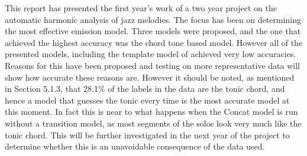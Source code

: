 \documentclass[bsc,singlespacing,parskip,deptreport,twoside,frontabs]{infthesis}
\begin{document}
This report has presented the first year's work of a two year project on the automatic harmonic analysis of jazz melodies. The focus has been on determining the most effective emission model. Three models were proposed, and the one that achieved the highest accuracy was the chord tone based model. However all of the presented models, including the template model of \cite{pardo2002algorithms} achieved very low accuracies. Reasons for this have been proposed and testing on more representative data will show how accurate these reasons are. However it should be noted, as mentioned in Section 5.1.3, that 28.1\% of the labels in the data are the tonic chord, and hence a model that guesses the tonic every time is the most accurate model at this moment. In fact this is near to what happens when the Concat model is run without a transition model, as most segments of the solos look very much like the tonic chord. This will be further investigated in the next year of the project to determine whether this is an unavoidable consequence of the data used.



{}
\end{document}
